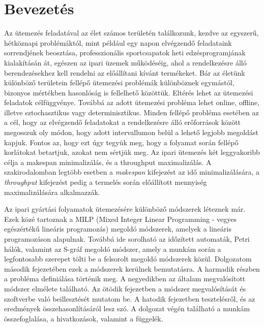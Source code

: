 \chapter{Bevezetés}
Az ütemezés feladatával az élet számos területén találkozunk, kezdve az egyszerű, hétköznapi problémáktól, mint például egy napon elvégzendő feladataink sorrendjének beosztása, professzionális sportcsapatok heti edzésprogramjának kialakításán át, egészen az ipari üzemek működéséig, ahol a rendelkezésre álló berendezésekhez kell rendelni az előállítani kívánt termékeket.
Bár az életünk különböző területein fellépő ütemezési problémák különböznek egymástól, bizonyos mértékben hasonlóság is fellelhető közöttük.
Eltérés lehet az ütemezési feladatok célfüggvénye.
Továbbá az adott ütemezési probléma lehet online, offline, illetve sztochasztikus vagy determinisztikus.
Minden fellépő probléma esetében az a cél, hogy az elvégzendő feladatokat a rendelkezésre álló erőforrások között megosszuk oly módon, hogy adott intervallumon belül a lehető legjobb megoldást kapjuk.
Fontos az, hogy ezt úgy tegyük meg, hogy a folyamat során fellépő korlátokat betartjuk, azokat nem sértjük meg.
Az ipari ütemezés két leggyakoribb célja a makespan minimalizálás, és a throughput maximalizálás.
A szakirodalomban legtöbb esetben a \textit{makespan} kifejezést az idő minimalizálására, a \textit{throughput} kifejezést pedig a termelés során előállított mennyiség maximalizálására alkalmazzák.

Az ipari gyártási folyamatok ütemezésére különböző módszerek léteznek már.
Ezek közé tartoznak a MILP (Mixed Integer Linear Programming - vegyes egészértékű lineáris programozás) megoldó módszerek, amelyek a lineáris programozáson alapulnak.
Továbbá ide sorolható az időzített automaták, Petri hálók, valamint az S-gráf megoldó módszer, amely a munkám során a legfontosabb szerepet tölti be a felsorolt megoldó módszerek közül.
Dolgozatom második fejezetében ezek a módszerek kerülnek bemutatásra.
A harmadik részben a probléma definiálása történik meg.
A negyedikben az általam megvalósított módszer elmélete található.
Az ötödik fejezetben a módszer megvalósítását és szoftverbe való beillesztését mutatom be.
A hatodik fejezetben tesztelésről, és az eredmények összehasonlításáról lesz szó.
A dolgozat végén található a munkám összefoglalása, a hivatkozások, valamint a függelék.